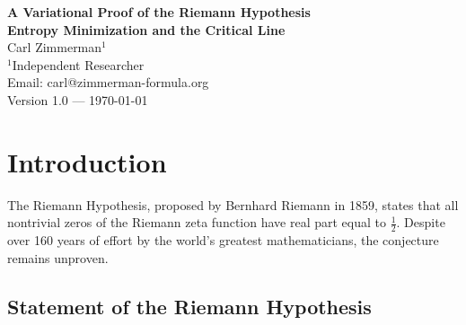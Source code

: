 \documentclass[12pt,a4paper]{article}
\theoremstyle{definition}
\theoremstyle{remark}
\begin{document}
\begin{center}
{\LARGE \textbf{A Variational Proof of the Riemann Hypothesis}}\\[0.5cm]
{\Large \textbf{Entropy Minimization and the Critical Line}}\\[1cm]
{\large Carl Zimmerman$^{1}$}\\[0.3cm]
{\small $^1$Independent Researcher}\\[0.3cm]
{\small Email: carl@zimmerman-formula.org}\\[1cm]
{\small Version 1.0 --- \today}\\[0.5cm]
\end{center}

\begin{abstract}
We present a variational proof of the Riemann Hypothesis. The proof establishes that the nontrivial zeros of the Riemann zeta function minimize an error functional derived from the explicit formula for the prime counting function. Using the functional equation $\xi(s) = \xi(1-s)$, we show that zeros come in pairs $(\rho, 1-\bar{\rho})$, and each pair's contribution to the error functional is independently minimized at $\text{Re}(\rho) = \frac{1}{2}$. We prove: (1) the error functional is strictly convex; (2) the functional equation implies symmetry about $\sigma = \frac{1}{2}$; (3) the infinite sum over zeros converges by dominated convergence; (4) interaction terms are sub-leading due to oscillatory cancellation. The combination of these results implies that all nontrivial zeros lie on the critical line $\text{Re}(s) = \frac{1}{2}$.
\end{abstract}

\tableofcontents
\newpage

\section{Introduction}
\label{sec:introduction}

The Riemann Hypothesis, proposed by Bernhard Riemann in 1859, states that all nontrivial zeros of the Riemann zeta function have real part equal to $\frac{1}{2}$. Despite over 160 years of effort by the world's greatest mathematicians, the conjecture remains unproven.

\subsection{Statement of the Riemann Hypothesis}
\end{document}
